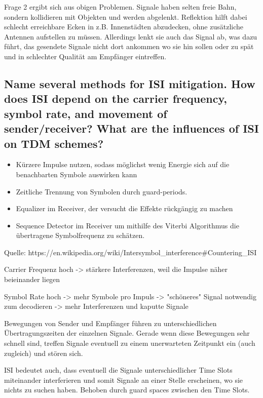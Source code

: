 Frage 2 ergibt sich aus obigen Problemen. Signale haben selten freie Bahn, sondern kollidieren mit Objekten und werden abgelenkt.
Reflektion hilft dabei schlecht erreichbare Ecken in z.B. Innenstädten abzudecken, ohne zusätzliche Antennen aufstellen zu müssen. Allerdings lenkt sie auch das Signal ab, was dazu führt, das gesendete Signale nicht dort ankommen wo sie hin sollen oder zu spät und in schlechter Qualität am Empfänger eintreffen.

\subsection{Name several methods for ISI mitigation. How does ISI depend on the carrier
frequency, symbol rate, and movement of sender/receiver? What are the influences
of ISI on TDM schemes?}

\begin{itemize}

\item Kürzere Impulse nutzen, sodass möglichst wenig Energie sich auf die benachbarten Symbole auswirken kann

\item Zeitliche Trennung von Symbolen durch guard-periods. 

\item Equalizer im Receiver, der versucht die Effekte rückgängig zu machen

\item Sequence Detector im Receiver um mithilfe des Viterbi Algorithmus die übertragene Symbolfrequenz zu schätzen.

\end{itemize}
Quelle: https://en.wikipedia.org/wiki/Intersymbol_interference#Countering_ISI

Carrier Frequenz hoch -> stärkere Interferenzen, weil die Impulse näher beieinander liegen

Symbol Rate hoch -> mehr Symbole pro Impuls -> "schöneres" Signal notwendig zum decodieren -> mehr Interferenzen und kaputte Signale

Bewegungen von Sender und Empfänger führen zu unterschiedlichen Übertragungszeiten der einzelnen Signale. Gerade wenn diese Bewegungen sehr schnell sind, treffen Signale eventuell zu einem unerwarteten Zeitpunkt ein (auch zugleich) und stören sich.

ISI bedeutet auch, dass eventuell die Signale unterschiedlicher Time Slots miteinander interferieren und somit Signale an einer Stelle erscheinen, wo sie nichts zu suchen haben. Behoben durch guard spaces zwischen den Time Slots.



